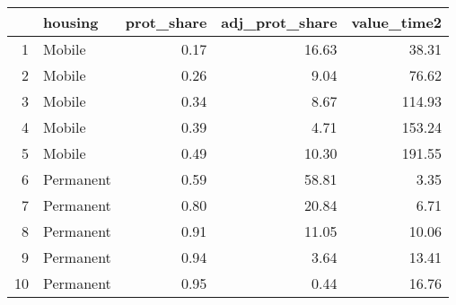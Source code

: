 \begin{table}[ht]
\centering
\begin{tabular}{rlrrr}
  \hline
 & housing & prot\_share & adj\_prot\_share & value\_time2 \\ 
  \hline
1 & Mobile & 0.17 & 16.63 & 38.31 \\ 
  2 & Mobile & 0.26 & 9.04 & 76.62 \\ 
  3 & Mobile & 0.34 & 8.67 & 114.93 \\ 
  4 & Mobile & 0.39 & 4.71 & 153.24 \\ 
  5 & Mobile & 0.49 & 10.30 & 191.55 \\ 
  6 & Permanent & 0.59 & 58.81 & 3.35 \\ 
  7 & Permanent & 0.80 & 20.84 & 6.71 \\ 
  8 & Permanent & 0.91 & 11.05 & 10.06 \\ 
  9 & Permanent & 0.94 & 3.64 & 13.41 \\ 
  10 & Permanent & 0.95 & 0.44 & 16.76 \\ 
   \hline
\end{tabular}
\end{table}
